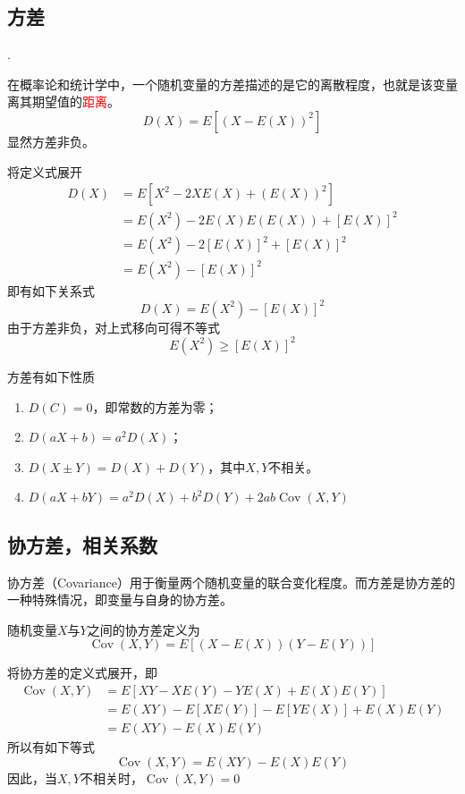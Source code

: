 \subsection{方差}
.
\begin{definition}
    在概率论和统计学中，一个随机变量的方差描述的是它的离散程度，也就是该变量离其期望值的\textcolor{red}{距离}。
    \[ D(X) = E\left[(X-E(X))^2\right] \]
    显然方差非负。
\end{definition}
将定义式展开
\begin{align*}
    D(X) & = E\left[X^2 -2XE(X)+(E(X))^2\right] \\
         & = E(X^2)-2E(X)E(E(X))+[E(X)]^2       \\
         & = E(X^2)- 2[E(X)]^2 + [E(X)]^2       \\
         & = E(X^2) - [E(X)]^2
\end{align*}
即有如下关系式
\begin{equation}
    D(X) = E(X^2) - [E(X)]^2
\end{equation}
由于方差非负，对上式移向可得不等式
\begin{equation}
    E(X^2)\geq [E(X)]^2
\end{equation}

方差有如下性质
\begin{enumerate}[(1)]
    \item $D(C)=0$，即常数的方差为零；
    \item $D(aX+b) = a^2D(X)$；
    \item $D(X\pm Y) = D(X)+D(Y)$，其中$X,Y$不相关。
    \item $D(aX+bY)=a^2D(X)+b^2D(Y) + 2ab\operatorname{Cov}(X,Y)$
\end{enumerate}

\subsection{协方差，相关系数}
协方差（Covariance）用于衡量两个随机变量的联合变化程度。而方差是协方差的一种特殊情况，即变量与自身的协方差。
\begin{definition}
    随机变量$X$与$Y$之间的协方差定义为
    \[ \operatorname{Cov}(X,Y) = E[(X-E(X))(Y-E(Y))] \]
\end{definition}
将协方差的定义式展开，即
\begin{align*}
    \operatorname{Cov}(X,Y) & = E[XY -XE(Y) - YE(X) + E(X)E(Y)]     \\
                            & =E(XY) -E[XE(Y)] - E[YE(X)] +E(X)E(Y) \\
                            & =E(XY) - E(X)E(Y)
\end{align*}
所以有如下等式
\begin{equation}
    \operatorname{Cov}(X,Y) = E(XY)-E(X)E(Y)
\end{equation}
因此，当$X,Y$不相关时，$\operatorname{Cov}(X,Y)=0$


